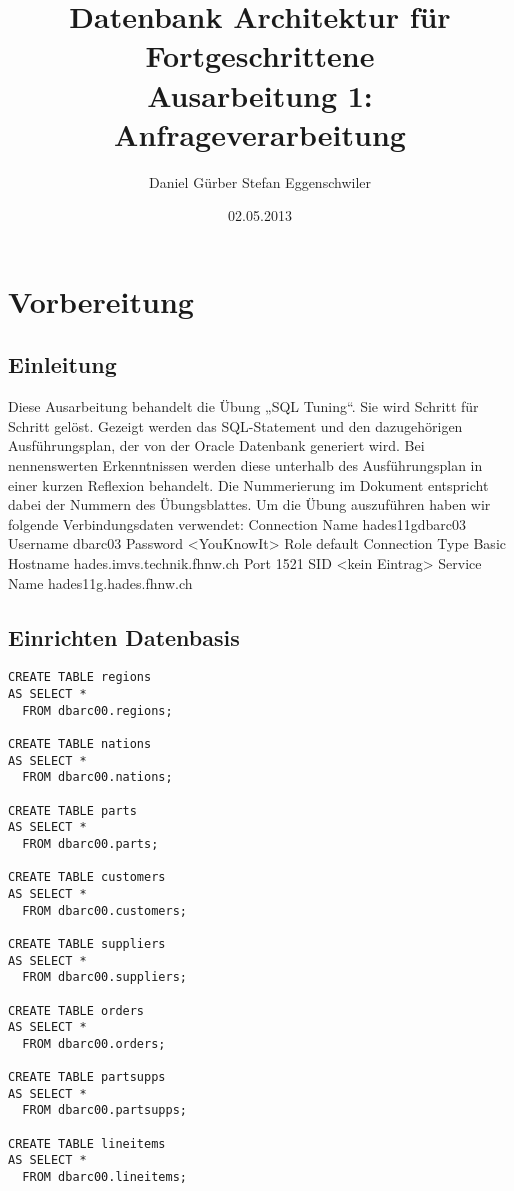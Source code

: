 \documentclass[10pt]{article}
\title{
\vspace{4cm}
\huge{Datenbank Architektur für Fortgeschrittene}\\
\vspace{0.2cm}
\Large{Ausarbeitung 1: Anfrageverarbeitung}\\
}
\author{Daniel Gürber \cr Stefan Eggenschwiler}
\date{02.05.2013}
\begin{document}
\maketitle
\thispagestyle{fancy}

\newpage

\tableofcontents	


\newpage
\setcounter{page}{1}


\section{Vorbereitung}
\subsection{Einleitung}
Diese Ausarbeitung behandelt die Übung „SQL Tuning“. Sie wird Schritt für Schritt gelöst. Gezeigt werden das SQL-Statement und den dazugehörigen Ausführungsplan, der von der Oracle Datenbank generiert wird. Bei nennenswerten Erkenntnissen werden diese unterhalb des Ausführungsplan in einer kurzen Reflexion behandelt. Die Nummerierung im Dokument entspricht dabei der Nummern des Übungsblattes.
Um die Übung auszuführen haben wir folgende Verbindungsdaten verwendet: \newline \newline
Connection Name hades11gdbarc03 \newline
Username dbarc03 \newline
Password <YouKnowIt> \newline
Role default \newline
Connection Type Basic \newline
Hostname hades.imvs.technik.fhnw.ch \newline
Port 1521 \newline
SID <kein Eintrag> \newline
Service Name hades11g.hades.fhnw.ch

\subsection{Einrichten Datenbasis}
\begin{lstlisting}[style=sql]
CREATE TABLE regions
AS SELECT *
  FROM dbarc00.regions;
  
CREATE TABLE nations
AS SELECT *
  FROM dbarc00.nations;

CREATE TABLE parts
AS SELECT *
  FROM dbarc00.parts;
  
CREATE TABLE customers
AS SELECT *
  FROM dbarc00.customers;

CREATE TABLE suppliers
AS SELECT *
  FROM dbarc00.suppliers;

CREATE TABLE orders
AS SELECT *
  FROM dbarc00.orders;

CREATE TABLE partsupps
AS SELECT *
  FROM dbarc00.partsupps;

CREATE TABLE lineitems
AS SELECT *
  FROM dbarc00.lineitems;
\end{lstlisting}
\end{document}
